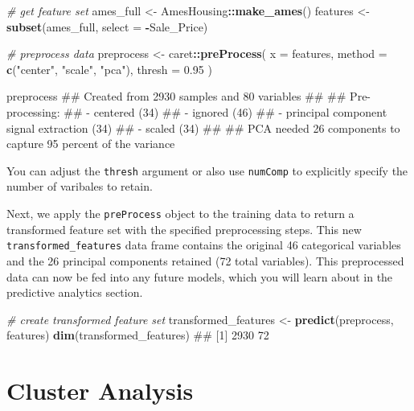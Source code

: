 \documentclass[]{book}
\newenvironment{Shaded}{\begin{snugshade}}{\end{snugshade}}
\newcommand{\CommentTok}[1]{\textcolor[rgb]{0.56,0.35,0.01}{\textit{#1}}}
\newcommand{\DataTypeTok}[1]{\textcolor[rgb]{0.13,0.29,0.53}{#1}}
\newcommand{\FloatTok}[1]{\textcolor[rgb]{0.00,0.00,0.81}{#1}}
\newcommand{\KeywordTok}[1]{\textcolor[rgb]{0.13,0.29,0.53}{\textbf{#1}}}
\newcommand{\NormalTok}[1]{#1}
\newcommand{\OperatorTok}[1]{\textcolor[rgb]{0.81,0.36,0.00}{\textbf{#1}}}
\newcommand{\StringTok}[1]{\textcolor[rgb]{0.31,0.60,0.02}{#1}}
\theoremstyle{definition}
\theoremstyle{definition}
\theoremstyle{definition}
\theoremstyle{remark}
\let\BeginKnitrBlock\begin \let\EndKnitrBlock\end
\begin{document}
\begin{Shaded}
\begin{Highlighting}[]
\CommentTok{# get feature set}
\NormalTok{ames_full <-}\StringTok{ }\NormalTok{AmesHousing}\OperatorTok{::}\KeywordTok{make_ames}\NormalTok{()}
\NormalTok{features <-}\StringTok{ }\KeywordTok{subset}\NormalTok{(ames_full, }\DataTypeTok{select =} \OperatorTok{-}\NormalTok{Sale_Price)}

\CommentTok{# preprocess data}
\NormalTok{preprocess <-}\StringTok{ }\NormalTok{caret}\OperatorTok{::}\KeywordTok{preProcess}\NormalTok{(}
  \DataTypeTok{x =}\NormalTok{ features,}
  \DataTypeTok{method =} \KeywordTok{c}\NormalTok{(}\StringTok{"center"}\NormalTok{, }\StringTok{"scale"}\NormalTok{, }\StringTok{"pca"}\NormalTok{),}
  \DataTypeTok{thresh =} \FloatTok{0.95}
\NormalTok{)}

\NormalTok{preprocess}
\NormalTok{## Created from 2930 samples and 80 variables}
\NormalTok{## }
\NormalTok{## Pre-processing:}
\NormalTok{##   - centered (34)}
\NormalTok{##   - ignored (46)}
\NormalTok{##   - principal component signal extraction (34)}
\NormalTok{##   - scaled (34)}
\NormalTok{## }
\NormalTok{## PCA needed 26 components to capture 95 percent of the variance}
\end{Highlighting}
\end{Shaded}

\BeginKnitrBlock{note}
You can adjust the \texttt{thresh} argument or also use \texttt{numComp}
to explicitly specify the number of varibales to retain.
\EndKnitrBlock{note}

Next, we apply the \texttt{preProcess} object to the training data to
return a transformed feature set with the specified preprocessing steps.
This new \texttt{transformed\_features} data frame contains the original
46 categorical variables and the 26 principal components retained (72
total variables). This preprocessed data can now be fed into any future
models, which you will learn about in the predictive analytics section.

\begin{Shaded}
\begin{Highlighting}[]
\CommentTok{# create transformed feature set}
\NormalTok{transformed_features <-}\StringTok{ }\KeywordTok{predict}\NormalTok{(preprocess, features)}
\KeywordTok{dim}\NormalTok{(transformed_features)}
\NormalTok{## [1] 2930   72}
\end{Highlighting}
\end{Shaded}

\hypertarget{cluster-analysis}{%
\section{Cluster Analysis}\label{cluster-analysis}}
\end{document}
